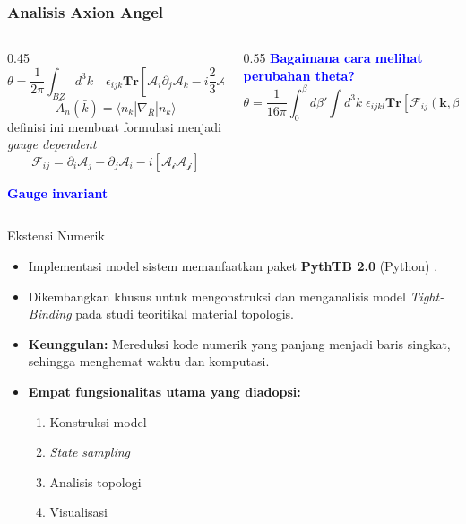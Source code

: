 \documentclass[13pt, aspectratio=169]{beamer}
\begin{document}
\begin{frame}
  \frametitle{Analisis Axion Angel}
  
  \begin{columns}
    \begin{column}{0.45\textwidth}
    \[
        \theta = \frac{1}{2π} \int_{BZ} d^3k \quad\epsilon_{ijk} \mathbf{Tr}\left[ \mathcal{A}_{i}\partial_{j}\mathcal{A}_{k} - i \frac{2}{3} \mathcal{A}_{i} \mathcal{A}_{j}\mathcal{A}_{k} \right]
      \]
       \[ \bar{A}_n (\bar{k}) =  \langle n_k | \nabla_{\bar{R}} | n_k \rangle \]
      \pause 
      definisi ini membuat formulasi menjadi \textit{gauge dependent}
      \pause
      \[
        \mathcal{F}_{ij} = \partial_{i}\mathcal{A}_{j} - \partial_{j}\mathcal{A}_{i} - i[\mathcal{A_{i}A_{j}}]
      \]
      \begin{center}
      \end{center}
      \begin{center}
        \textcolor{blue}{\textbf{Gauge invariant}}
      \end{center}
    \end{column}
    \begin{column}{0.55\textwidth} 
      \textcolor{blue}{\textbf{Bagaimana cara melihat perubahan theta?}}
      \pause
      \[
        \theta = \frac{1}{16 \pi}\int_{0}^{\beta}d\beta' \int d^3 k\; \epsilon_{ijkl} \mathbf{Tr}[\mathcal{F}_{ij}(\mathbf{k},\beta')\mathcal{F}_{kl}(\mathbf{k},\beta')]
      \]
    \end{column}
  \end{columns}
\end{frame}

\begin{frame}{Ekstensi Numerik}
    \begin{itemize}
        \item Implementasi model sistem memanfaatkan paket \textbf{PythTB 2.0} (Python) \parencite{Cole_Python_Tight_Binding_2025}.
        \item Dikembangkan khusus untuk mengonstruksi dan menganalisis model \textit{Tight-Binding} pada studi teoritikal material topologis.
        \item \textbf{Keunggulan:} Mereduksi kode numerik yang panjang menjadi baris singkat, sehingga menghemat waktu dan komputasi.
        \item \textbf{Empat fungsionalitas utama yang diadopsi:} 
        \begin{enumerate}
            \item Konstruksi model
            \item \textit{State sampling}
            \item Analisis topologi
            \item Visualisasi
        \end{enumerate}
    \end{itemize}
\end{frame}
\end{document}
